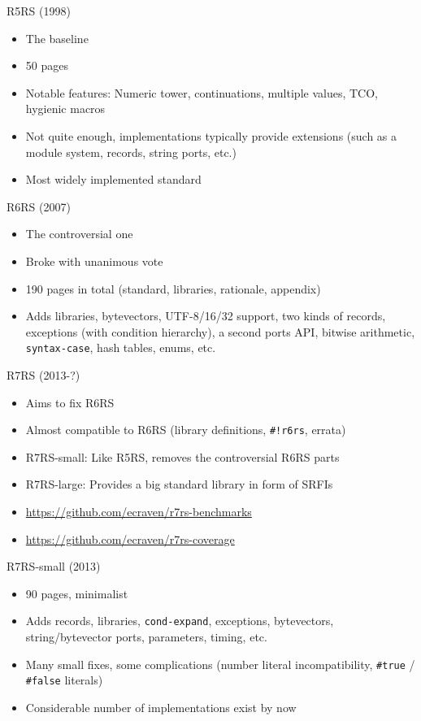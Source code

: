 \documentclass[presentation]{beamer}
\begin{document}
\begin{frame}[label=sec-2-2]{R5RS (1998)}
\begin{itemize}
\item The baseline
\item 50 pages
\item Notable features: Numeric tower, continuations, multiple values,
TCO, hygienic macros
\item Not quite enough, implementations typically provide extensions (such
as a module system, records, string ports, etc.)
\item Most widely implemented standard
\end{itemize}
\end{frame}

\begin{frame}[fragile,label=sec-2-3]{R6RS (2007)}
 \begin{itemize}
\item The controversial one
\item Broke with unanimous vote
\item 190 pages in total (standard, libraries, rationale, appendix)
\item Adds libraries, bytevectors, UTF-8/16/32 support, two kinds of
records, exceptions (with condition hierarchy), a second ports API,
bitwise arithmetic, \texttt{syntax-case}, hash tables, enums, etc.
\end{itemize}
\end{frame}

\begin{frame}[fragile,label=sec-2-4]{R7RS (2013-?)}
 \begin{itemize}
\item Aims to fix R6RS
\item Almost compatible to R6RS (library definitions, \texttt{\#!r6rs}, errata)
\item R7RS-small: Like R5RS, removes the controversial R6RS parts
\item R7RS-large: Provides a big standard library in form of SRFIs
\item \url{https://github.com/ecraven/r7rs-benchmarks}
\item \url{https://github.com/ecraven/r7rs-coverage}
\end{itemize}
\end{frame}

\begin{frame}[fragile,label=sec-2-5]{R7RS-small (2013)}
 \begin{itemize}
\item 90 pages, minimalist
\item Adds records, libraries, \texttt{cond-expand}, exceptions, bytevectors,
string/bytevector ports, parameters, timing, etc.
\item Many small fixes, some complications (number literal
incompatibility, \texttt{\#true} / \texttt{\#false} literals)
\item Considerable number of implementations exist by now
\end{itemize}
\end{frame}
\end{document}
